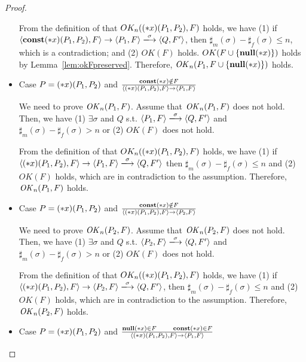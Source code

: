 \begin{proof}
\begin{itemize}
  From the definition of that \(OK_n((*x)(P_1, P_2), F)\) holds, we
  have (1) if \( \langle \scon\Sirx(P_1, P_2), F \rangle \rightarrow
  \langle P_1, F \rangle \xlongrightarrow{\sigma} \langle Q, F'
  \rangle \), then \(\sharp_m(\sigma) -
  \sharp_f(\sigma) \le n \), which is a contradiction; and (2)
  \(OK(F)\) holds. \(OK(F\cup\{{\bf null}(*x)\})\) holds by
  Lemma~\ref{lem:okFpreserved}. Therefore, \(\mathit{OK}_n(P_1,
  F\cup\{{\bf null}(*x)\})\) holds.


\item Case \( P = (*x)(P_1,P_2) \) and \( \frac{ \mathbf{const}(*x) \notin F}
  { \langle (*x)(P_1, P_2), F \rangle \rightarrow \langle P_1, F
    \rangle } \)

  We need to prove \(\mathit{OK}_n(P_1, F)\).  Assume that \(\mathit{OK}_n(P_1, F)\)
  does not hold. Then, we have (1) \( \exists \sigma \) and \(Q\)
  s.t. \( \langle P_1, F \rangle \xlongrightarrow{\sigma} \langle Q,
  F' \rangle \) and \(\sharp_{m}(\sigma) -
  \sharp_{f}(\sigma) > n\) or (2) \( OK(F)\) does not hold.

  From the definition of that \(OK_n((*x)(P_1, P_2), F)\) holds, we
  have (1) if \( \langle \Sirx(P_1, P_2), F \rangle \rightarrow
  \langle P_1, F \rangle \xlongrightarrow{\sigma} \langle Q, F'
  \rangle \) then \(\sharp_m(\sigma) -
  \sharp_f(\sigma) \le n \) and (2) \(OK(F)\) holds, which are in
  contradiction to the assumption.  Therefore, \(\mathit{OK}_n(P_1, F)\)
  holds.

\item Case \( P = (*x)(P_1,P_2) \) and \( \frac{ \mathbf{const}(*x) \notin F}
  { \langle (*x)(P_1, P_2), F \rangle \rightarrow \langle P_2, F
    \rangle } \)

  We need to prove \(\mathit{OK}_n(P_2, F)\).  Assume that \(\mathit{OK}_n(P_2, F)\)
  does not hold. Then, we have (1) \( \exists \sigma \) and \(Q\)
  s.t. \( \langle P_2, F \rangle \xlongrightarrow{\sigma} \langle Q,
  F' \rangle \) and \(\sharp_{m}(\sigma) -
  \sharp_{f}(\sigma) > n\) or (2) \( OK(F)\) does not hold.

  From the definition of that \(OK_n((*x)(P_1, P_2), F)\) holds, we
  have (1) if \( \langle \Sirx(P_1, P_2), F \rangle \rightarrow
  \langle P_2, F \rangle \xlongrightarrow{\sigma} \langle Q, F'
  \rangle \), then \(\sharp_m(\sigma) -
  \sharp_f(\sigma) \le n \) and (2) \(OK(F)\) holds, which are in
  contradiction to the assumption.  Therefore, \(\mathit{OK}_n(P_2, F)\)
  holds.

\item Case \( P = (*x)(P_1,P_2) \) and \( \frac{ {\bf null}(*x) \in F
  \quad\quad \mathbf{const}(*x) \in F} { \langle (*x)(P_1, P_2), F \rangle
  \rightarrow \langle P_1, F \rangle } \)


\end{itemize}
\end{proof}
